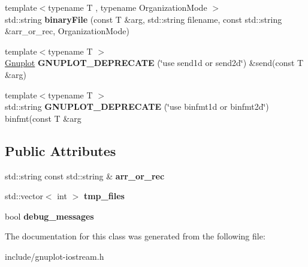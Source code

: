 \begin{DoxyCompactItemize}
\item 
\mbox{\label{classgnuplotio_1_1Gnuplot_ad90501e6dbab5379abcd76fd0e2e4ef1}} 
{\footnotesize template$<$typename T , typename Organization\+Mode $>$ }\\std\+::string {\bfseries binary\+File} (const T \&arg, std\+::string filename, const std\+::string \&arr\+\_\+or\+\_\+rec, Organization\+Mode)
\item 
\mbox{\label{classgnuplotio_1_1Gnuplot_a4e730c762706c7235eb105bcb56ad185}} 
{\footnotesize template$<$typename T $>$ }\\\hyperlink{classgnuplotio_1_1Gnuplot}{Gnuplot} {\bfseries G\+N\+U\+P\+L\+O\+T\+\_\+\+D\+E\+P\+R\+E\+C\+A\+TE} (\char`\"{}use send1d or send2d\char`\"{}) \&send(const T \&arg)
\item 
\mbox{\label{classgnuplotio_1_1Gnuplot_aeb3ba94ed04ecd46b55f89591ba23e7c}} 
{\footnotesize template$<$typename T $>$ }\\std\+::string {\bfseries G\+N\+U\+P\+L\+O\+T\+\_\+\+D\+E\+P\+R\+E\+C\+A\+TE} (\char`\"{}use binfmt1d or binfmt2d\char`\"{}) binfmt(const T \&arg
\end{DoxyCompactItemize}
\subsection*{Public Attributes}
\begin{DoxyCompactItemize}
\item 
\mbox{\label{classgnuplotio_1_1Gnuplot_a2d194dbd4d2f3475ff6f9b8384e62a9f}} 
std\+::string const std\+::string \& {\bfseries arr\+\_\+or\+\_\+rec}
\item 
\mbox{\label{classgnuplotio_1_1Gnuplot_a92a4f6322e486de17db4507a5fc77348}} 
std\+::vector$<$ int $>$ {\bfseries tmp\+\_\+files}
\item 
\mbox{\label{classgnuplotio_1_1Gnuplot_a63e08bfd0cd02937d895ecfb6180107c}} 
bool {\bfseries debug\+\_\+messages}
\end{DoxyCompactItemize}


The documentation for this class was generated from the following file\+:\begin{DoxyCompactItemize}
\item 
include/gnuplot-\/iostream.\+h\end{DoxyCompactItemize}
